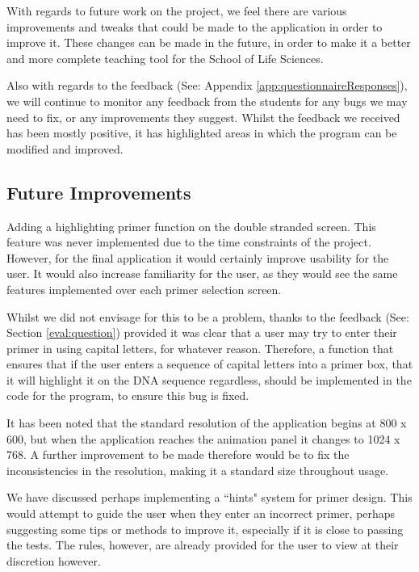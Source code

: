 With regards to future work on the project, we feel there are various improvements and tweaks that could be made to the application in order to improve it. These changes can be made in the future, in order to make it a better and more complete teaching tool for the School of Life Sciences.

Also with regards to the feedback (See: Appendix \ref{app:questionnaireResponses}), we will continue to monitor any feedback from the students for any bugs we may need to fix, or any improvements they suggest. Whilst the feedback we received has been mostly positive, it has highlighted areas in which the program can be modified and improved.

\subsection{Future Improvements}

Adding a highlighting primer function on the double stranded screen. This feature was never implemented due to the time constraints of the project. However, for the final application it would certainly improve usability for the user. It would also increase familiarity for the user, as they would see the same features implemented over each primer selection screen.

Whilst we did not envisage for this to be a problem, thanks to the feedback (See: Section \ref{eval:question}) provided it was clear that a user may try to enter their primer in using capital letters, for whatever reason. Therefore, a function that ensures that if the user enters a sequence of capital letters into a primer box, that it will highlight it on the DNA sequence regardless, should be implemented in the code for the program, to ensure this bug is fixed.

It has been noted that the standard resolution of the application begins at 800 x 600, but when the application reaches the animation panel it changes to 1024 x 768. A further improvement to be made therefore would be to fix the inconsistencies in the resolution, making it a standard size throughout usage.

We have discussed perhaps implementing a ``hints" system for primer design. This would attempt to guide the user when they enter an incorrect primer, perhaps suggesting some tips or methods to improve it, especially if it is close to passing the tests. The rules, however, are already provided for the user to view at their discretion however.

